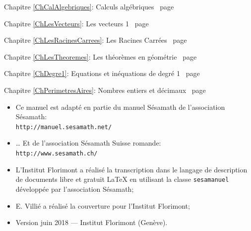 \documentclass[TS]{sesamanuel}
\begin{document}
\begin{commentaire}

\textcolor{PartieFonction}{\PrerequisTitleFont 
Chapitre \ref{ChCalAlgebriques}: Calculs algébriques \dotfill\ page \pageref{ChCalAlgebriques}}

\vspace{2em}

\textcolor{PartieGeometrie}{\PrerequisTitleFont 
Chapitre \ref{ChLesVecteurs}: Les vecteurs 1 \dotfill\ page \pageref{ChLesVecteurs}}

\vspace{2em}

\textcolor{PartieFonction}{\PrerequisTitleFont 
Chapitre \ref{ChLesRacinesCarrees}: Les Racines Carrées \dotfill\ page \pageref{ChLesRacinesCarrees}}

\vspace{2em}

\textcolor{PartieGeometrie}{\PrerequisTitleFont 
Chapitre \ref{ChLesTheoremes}: Les théorèmes en géométrie \dotfill\ page \pageref{ChLesTheoremes}}

\vspace{2em}

\textcolor{PartieFonction}{\PrerequisTitleFont 
Chapitre \ref{ChDegre1}: Equations et inéquations de degré 1 \dotfill\ page \pageref{ChDegre1}}

\vspace{2em}

\textcolor{PartieFonction}{\PrerequisTitleFont 
Chapitre \ref{ChPerimetresAires}: Nombres entiers et décimaux \dotfill\ page \pageref{ChPerimetresAires}}

\vspace{2em}

\end{commentaire}

\vfill


\newpage


\begin{prerequis}
\begin{itemize}
\item  Ce manuel est adapté en partie du manuel Sésamath de l'association Sésamath:\\
\texttt{http://manuel.sesamath.net/}
\item … Et de l'association Sésamath Suisse romande:\\ \texttt{http://www.sesamath.ch/}
\item L'Institut Florimont a réalisé la transcription dans le langage de description de documents libre et gratuit \LaTeX{} en utilisant la classe \texttt{sesamanuel} développée par l'association Sésamath;
\item E. Villié a réalisé la couverture pour l'Institut Florimont;
\item Version juin 2018 --- Institut Florimont (Genève).
\end{itemize}
 \end{prerequis}
\end{document}
